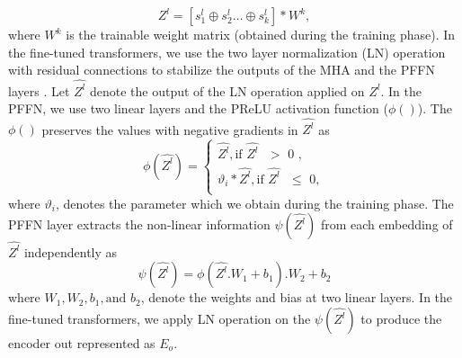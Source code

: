 \documentclass[preprint,review,12pt]{elsarticle}
\begin{document}
\begin{equation}
	Z^l = [s_1^l \oplus s_2^l \ldots \oplus s_k^l] * W^k,
\end{equation}
where $W^k$ is the trainable weight matrix (obtained during the training phase). In the fine-tuned transformers, we use the two layer normalization (LN) operation with residual connections to stabilize the outputs of the MHA and the PFFN layers \cite{LN, arxiv.org/pdf/2002.04745.pdf} \cite{LN}. Let $\hat{Z^l}$ denote the output of the LN operation applied on $Z^l$. In the PFFN, we use two linear layers and the PReLU activation function ($\phi()$). The $\phi()$ preserves the values with negative gradients in $\hat{Z^l}$ as 
\begin{equation}  \label{eq7}
	\phi(\hat{Z^l}) = 
	\begin{cases}
		\hat{Z^l}, \text {if $\hat{Z^l}$ $>$ 0 }, \\
		\vartheta _{i} * \hat{Z^l}, \text {if $\hat{Z^l}$ $\leq$ 0}, \\
	\end{cases}
\end{equation}
where $\vartheta_{i}$, denotes the parameter which we obtain during the training phase. The PFFN layer extracts the non-linear information $\psi(\hat{Z^l})$ from each embedding of $\hat{Z^l}$ independently as 
\begin{equation}  \label{eq2}
	\psi(\hat{Z^l}) = \phi(\hat{Z^l}.W_1 + b_1).W_2 + b_2
\end{equation}
where $W_1, W_2, b_1, \text{and } b_2$, denote the weights and bias at two linear layers. In the fine-tuned transformers, we apply LN operation on the $\psi(\hat{Z^l})$ to produce the encoder out represented as $E_{o}$. 
\end{document}
